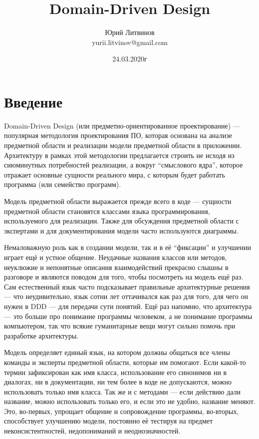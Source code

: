 \documentclass[a5paper]{article}
\title{Domain-Driven Design}
\author{Юрий Литвинов\\\small{yurii.litvinov@gmail.com}}
\date{24.03.2020г}
\begin{document}
\maketitle
\thispagestyle{empty}

\section{Введение}

 Domain-Driven Design (или предметно-ориентированное проектирование) --- популярная методология проектирования ПО, которая основана на анализе предметной области и реализации модели предметной области в приложении. Архитектуру в рамках этой методологии предлагается строить не исходя из сиюминутных потребностей реализации, а вокруг ``смыслового ядра'', которое отражает основные сущности реального мира, с которым будет работать программа (или семейство программ).

Модель предметной области выражается прежде всего в коде --- сущности предметной области становятся классами языка программирования, используемого для реализации. Также для обсуждения предметной области с экспертами и для документирования модели часто используются диаграммы.

Немаловажную роль как в создании модели, так и в её ``фиксации'' и улучшении играет ещё и устное общение. Неудачные названия классов или методов, неуклюжие и непонятные описания взаимодействий прекрасно слышны в разговоре и являются поводом для того, чтобы посмотреть на модель ещё раз. Сам естественный язык часто подсказывает правильные архитектурные решения --- что неудивительно, язык сотни лет оттачивался как раз для того, для чего он нужен в DDD --- для передачи сути понятий. Ещё раз напомню, что архитектура --- это больше про понимание программы человеком, а не понимание программы компьютером, так что всякие гуманитарные вещи могут сильно помочь при разработке архитектуры.

Модель определяет единый язык, на котором должны общаться все члены команды и эксперты предметной области, которые им помогают. Если какой-то термин зафиксирован как имя класса, использование его синонимов ни в диалогах, ни в документации, ни тем более в коде не допускаются, можно использовать только имя класса. Так же и с методами --- если действию дали название, можно использовать только его, и если это не удобно, название меняют. Это, во-первых, упрощает общение и сопровождение программы, во-вторых, способствует улучшению модели, постоянно её тестируя на предмет неконсистентностей, недопониманий и неоднозначностей.
\end{document}
